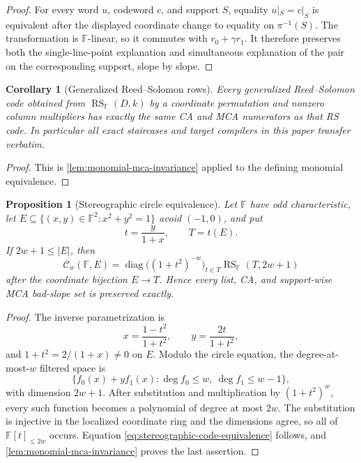 \documentclass[11pt,a4paper]{amsart}
\numberwithin{equation}{section}
\newtheorem{proposition}[proposition]{Proposition}
\newtheorem{corollary}[corollary]{Corollary}
\theoremstyle{remark}
\DeclareMathOperator{\RS}{RS}
\DeclareMathOperator{\diag}{diag}
\newcommand{\F}{\mathbb F}
\newcommand{\Ccal}{\mathcal C}
\newcommand{\abs}[1]{\lvert #1\rvert}
\begin{document}
\begin{proof}
For every word \(u\), codeword \(c\), and support \(S\), equality
\(u|_S=c|_S\) is equivalent after the displayed coordinate change to
equality on \(\pi^{-1}(S)\).  The transformation is \(\F\)-linear, so it
commutes with \(r_0+\gamma r_1\).  It therefore preserves both the
single-line-point explanation and simultaneous explanation of the pair
on the corresponding support, slope by slope.
\end{proof}

\begin{corollary}[Generalized Reed--Solomon rows]
\label{cor:grs-transfer}
Every generalized Reed--Solomon code obtained from \(\RS_\F(D,k)\) by
a coordinate permutation and nonzero column multipliers has exactly the
same CA and MCA numerators as that RS code.  In particular all exact
staircases and target compilers in this paper transfer verbatim.
\end{corollary}

\begin{proof}
This is \cref{lem:monomial-mca-invariance} applied to the defining
monomial equivalence.
\end{proof}

\begin{proposition}[Stereographic circle equivalence]
\label{prop:stereographic-circle-equivalence}
Let \(\F\) have odd characteristic, let
\(E\subseteq\{(x,y)\in\F^2:x^2+y^2=1\}\) avoid \((-1,0)\), and put
\[
 t=\frac{y}{1+x},\qquad T=t(E).
\]
If \(2w+1\le\abs E\), then
\[
 \Ccal_w(\F,E)
  =\diag\bigl((1+t^2)^{-w}\bigr)_{t\in T}
       \RS_\F(T,2w+1)                             \tag{SC1}
 \label{eq:stereographic-code-equivalence}
\]
after the coordinate bijection \(E\to T\).  Hence every list, CA, and
support-wise MCA bad-slope set is preserved exactly.
\end{proposition}

\begin{proof}
The inverse parametrization is
\[
 x=\frac{1-t^2}{1+t^2},\qquad
 y=\frac{2t}{1+t^2},
\]
and \(1+t^2=2/(1+x)\ne0\) on \(E\).  Modulo the circle equation, the
degree-at-most-\(w\) filtered space is
\[
 \{f_0(x)+yf_1(x):\deg f_0\le w,\ \deg f_1\le w-1\},
\]
with dimension \(2w+1\).  After substitution and multiplication by
\((1+t^2)^w\), every such function becomes a polynomial of degree at
most \(2w\).  The substitution is injective in the localized coordinate
ring and the dimensions agree, so all of \(\F[t]_{\le2w}\) occurs.
Equation \eqref{eq:stereographic-code-equivalence} follows, and
\cref{lem:monomial-mca-invariance} proves the last assertion.
\end{proof}
\end{document}
